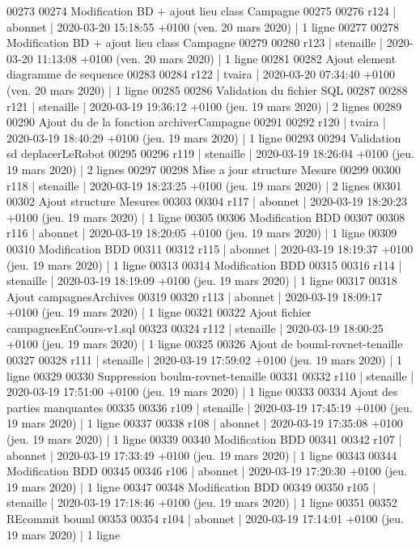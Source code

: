 \begin{DoxyCode}
00273 
00274 Modification BD + ajout lieu class Campagne
00275 
00276 r124 | abonnet | 2020-03-20 15:18:55 +0100 (ven. 20 mars 2020) | 1 ligne
00277 
00278 Modification BD + ajout lieu class Campagne
00279 
00280 r123 | stenaille | 2020-03-20 11:13:08 +0100 (ven. 20 mars 2020) | 1 ligne
00281 
00282 Ajout element diagramme de sequence
00283 
00284 r122 | tvaira | 2020-03-20 07:34:40 +0100 (ven. 20 mars 2020) | 1 ligne
00285 
00286 Validation du fichier SQL
00287 
00288 r121 | stenaille | 2020-03-19 19:36:12 +0100 (jeu. 19 mars 2020) | 2 lignes
00289 
00290 Ajout du de la fonction archiverCampagne
00291 
00292 r120 | tvaira | 2020-03-19 18:40:29 +0100 (jeu. 19 mars 2020) | 1 ligne
00293 
00294 Validation sd deplacerLeRobot
00295 
00296 r119 | stenaille | 2020-03-19 18:26:04 +0100 (jeu. 19 mars 2020) | 2 lignes
00297 
00298 Mise a jour structure Mesure
00299 
00300 r118 | stenaille | 2020-03-19 18:23:25 +0100 (jeu. 19 mars 2020) | 2 lignes
00301 
00302 Ajout structure Mesures
00303 
00304 r117 | abonnet | 2020-03-19 18:20:23 +0100 (jeu. 19 mars 2020) | 1 ligne
00305 
00306 Modification BDD
00307 
00308 r116 | abonnet | 2020-03-19 18:20:05 +0100 (jeu. 19 mars 2020) | 1 ligne
00309 
00310 Modification BDD
00311 
00312 r115 | abonnet | 2020-03-19 18:19:37 +0100 (jeu. 19 mars 2020) | 1 ligne
00313 
00314 Modification BDD
00315 
00316 r114 | stenaille | 2020-03-19 18:19:09 +0100 (jeu. 19 mars 2020) | 1 ligne
00317 
00318 Ajout campagnesArchives
00319 
00320 r113 | abonnet | 2020-03-19 18:09:17 +0100 (jeu. 19 mars 2020) | 1 ligne
00321 
00322 Ajout fichier campagnesEnCours-v1.sql
00323 
00324 r112 | stenaille | 2020-03-19 18:00:25 +0100 (jeu. 19 mars 2020) | 1 ligne
00325 
00326 Ajout de bouml-rovnet-tenaille
00327 
00328 r111 | stenaille | 2020-03-19 17:59:02 +0100 (jeu. 19 mars 2020) | 1 ligne
00329 
00330 Suppression boulm-rovnet-tenaille
00331 
00332 r110 | stenaille | 2020-03-19 17:51:00 +0100 (jeu. 19 mars 2020) | 1 ligne
00333 
00334 Ajout des parties manquantes
00335 
00336 r109 | stenaille | 2020-03-19 17:45:19 +0100 (jeu. 19 mars 2020) | 1 ligne
00337 
00338 r108 | abonnet | 2020-03-19 17:35:08 +0100 (jeu. 19 mars 2020) | 1 ligne
00339 
00340 Modification BDD
00341 
00342 r107 | abonnet | 2020-03-19 17:33:49 +0100 (jeu. 19 mars 2020) | 1 ligne
00343 
00344 Modification BDD
00345 
00346 r106 | abonnet | 2020-03-19 17:20:30 +0100 (jeu. 19 mars 2020) | 1 ligne
00347 
00348 Modification BDD
00349 
00350 r105 | stenaille | 2020-03-19 17:18:46 +0100 (jeu. 19 mars 2020) | 1 ligne
00351 
00352 REcommit bouml
00353 
00354 r104 | abonnet | 2020-03-19 17:14:01 +0100 (jeu. 19 mars 2020) | 1 ligne

\end{DoxyCode}

